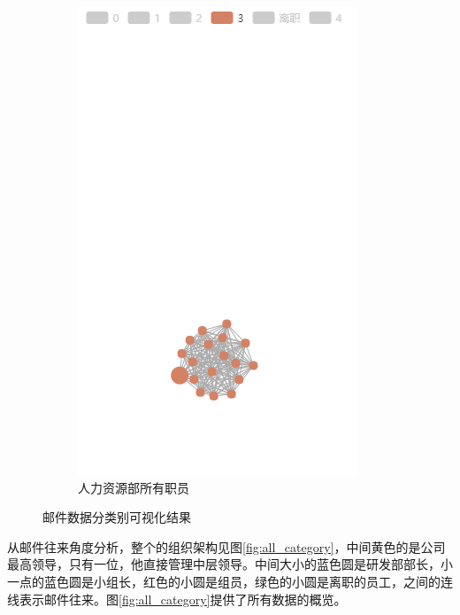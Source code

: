 \documentclass[journal]{vgtc}                %
\begin{document}
\begin{figure}
\begin{subfigure}{0.3\linewidth}
		\includegraphics[width=\linewidth]{pictures/5-4.png}
		\caption{人力资源部所有职员} %
		\label{fig:hr}
	\end{subfigure}
	\caption{邮件数据分类别可视化结果} %
\end{figure}

从邮件往来角度分析，整个的组织架构见图\ref{fig:all_category}，中间黄色的是公司最高领导，只有一位，他直接管理中层领导。中间大小的蓝色圆是研发部部长，小一点的蓝色圆是小组长，红色的小圆是组员，绿色的小圆是离职的员工，之间的连线表示邮件往来。图\ref{fig:all_category}提供了所有数据的概览。
\end{document}
